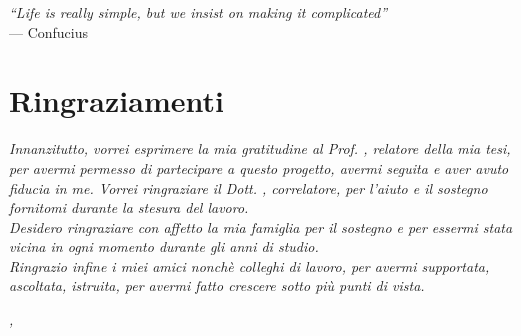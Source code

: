 \cleardoublepage
{}
{}

\begin{flushright}{
    \slshape
    ``Life is really simple, but we insist on making it complicated''} \\
    \medskip
    --- Confucius
\end{flushright}


\bigskip

\begingroup
\let\clearpage\relax
\let\cleardoublepage\relax
\let\cleardoublepage\relax

\chapter*{Ringraziamenti}

\noindent \textit{Innanzitutto, vorrei esprimere la mia gratitudine al Prof. \myProf, relatore della mia tesi, per avermi permesso di partecipare a questo progetto, avermi seguita e aver avuto fiducia in me. Vorrei ringraziare il Dott. \coProf, correlatore, per l'aiuto e il sostegno fornitomi durante la stesura del lavoro.}\\

\noindent \textit{Desidero ringraziare con affetto la mia famiglia per il sostegno e per essermi stata vicina in ogni momento durante gli anni di studio.}\\

\noindent \textit{Ringrazio infine i miei amici nonchè colleghi di lavoro, per avermi supportata, ascoltata, istruita, per avermi fatto crescere sotto più punti di vista.}\\
\bigskip

\noindent\textit{\myLocation, \myTime}
\hfill \myName

\endgroup
